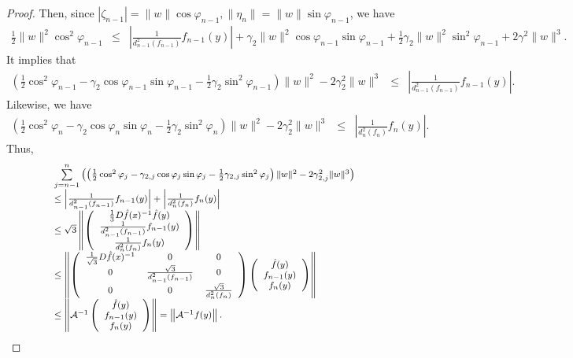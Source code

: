 \documentclass[12pt,oneside,reqno]{amsart}
\theoremstyle{definition}
\begin{document}
\begin{proof}
	Then, since $|\zeta_{n-1}|=\|w\|\cos\varphi_{n-1}, \|\eta_n\|=\|w\|\sin\varphi_{n-1}$, we have
	{\footnotesize
		\begin{eqnarray*}
			\frac{1}{2}\|w\|^2\cos^2\varphi_{n-1}& \leq & \left|\frac{1}{d_{n-1}^2(f_{n-1})}f_{n-1}(y)\right| + \gamma_2\|w\|^2\cos\varphi_{n-1}\sin\varphi_{n-1}+\frac{1}{2}\gamma_2\|w\|^2\sin^2\varphi_{n-1}+2\gamma^2\|w\|^3.
		\end{eqnarray*}
	}
	It implies that
	{\footnotesize
		\begin{eqnarray*}
			\left(\frac{1}{2}\cos^2\varphi_{n-1}-\gamma_2\cos\varphi_{n-1}\sin\varphi_{n-1}-\frac{1}{2}\gamma_2\sin^2\varphi_{n-1}\right)\|w\|^2-2\gamma_2^2\|w\|^3&\leq & \left|\frac{1}{d_{n-1}^2(f_{n-1})}f_{n-1}(y)\right| .
		\end{eqnarray*}}
		Likewise, we have
		{\footnotesize
			\begin{eqnarray*}
				\left(\frac{1}{2}\cos^2\varphi_{n}-\gamma_2\cos\varphi_{n}\sin\varphi_{n}-\frac{1}{2}\gamma_2\sin^2\varphi_{n}\right)\|w\|^2-2\gamma_2^2\|w\|^3&\leq & \left|\frac{1}{d_{n}^2(f_{n})}f_{n}(y)\right|.
			\end{eqnarray*}}
			Thus,
			$${\footnotesize
				\begin{array}{l}
				\sum\limits_{j=n-1}^n\left(\left(\frac{1}{2}\cos^2\varphi_{j}-\gamma_{2,j}\cos\varphi_j\sin\varphi_j-\frac{1}{2}\gamma_{2,j}\sin^2\varphi_j\right)\|w\|^2 -2\gamma_{2,j}^2\|w\|^3\right)\\
				\leq \left|\frac{1}{d_{n-1}^2(f_{n-1})}f_{n-1}(y)\right| + \left|\frac{1}{d_{n}^2(f_{n})}f_{n}(y)\right| \\
				\leq \sqrt{3}\left\|\left(\begin{array}{c}
				\frac{1}{3}D\hat{f}(x)^{-1}\hat{f}(y)\\
				\frac{1}{d_{n-1}^2(f_{n-1})}f_{n-1}(y)\\
				\frac{1}{d_{n}^2(f_{n})}f_{n}(y)
				\end{array}\right)\right\|\\
				\leq \left\|\left(\begin{array}{ccc}
				\frac{1}{\sqrt{3}}D\hat{f}(x)^{-1} & 0 & 0\\
				0 & \frac{\sqrt{3}}{d_{n-1}^2(f_{n-1})} & 0 \\
				0 & 0 & \frac{\sqrt{3}}{d_{n}^2(f_{n})}
				\end{array}\right)\left(\begin{array}{c}
				\hat{f}(y)\\
				f_{n-1}(y)\\
				f_n(y)
				\end{array}\right)\right\|\\
				\leq \left\|\mathcal{A}^{-1}\left(\begin{array}{c}
				\hat{f}(y)\\
				f_{n-1}(y)\\
				f_n(y)
				\end{array}\right)\right\|=\left\|\mathcal{A}^{-1}f(y)\right\|.
				\end{array}}$$
		\end{proof}
\end{document}
